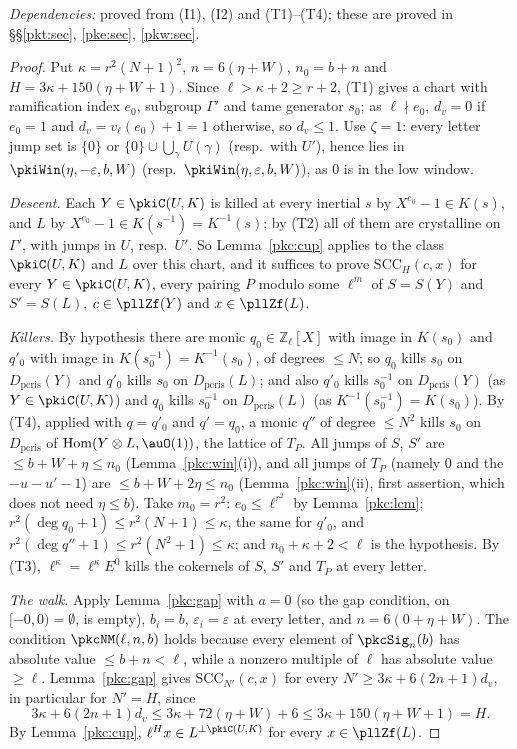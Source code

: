 \documentclass[10pt]{amsart}
\theoremstyle{definition}
\theoremstyle{remark}
\newcommand{\Z}{\mathbb Z}
\begin{document}
\emph{Dependencies:} proved from (I1), (I2) and (T1)--(T4); these are proved in \S\S\ref{pkt:sec},
\ref{pke:sec}, \ref{pkw:sec}.

\begin{proof}
Put $\kappa=r^2(N+1)^2$, $n=6(\eta+W)$, $n_0=b+n$ and $H=3\kappa+150(\eta+W+1)$. Since
$\ell>\kappa+2\ge r+2$, (T1) gives a chart with ramification index $e_0$, subgroup $\Gamma'$ and tame
generator $s_0$; as $\ell\nmid e_0$, $d_v=0$ if $e_0=1$ and $d_v=v_\ell(e_0)+1=1$ otherwise, so $d_v\le1$.
Use $\zeta=1$: every letter jump set is $\{0\}$ or $\{0\}\cup\bigcup_\gamma U(\gamma)$ (resp.\ with
$U'$), hence lies in $\pkiWin(\eta,-\varepsilon,b,W)$ (resp.\ $\pkiWin(\eta,\varepsilon,b,W)$), as $0$ is
in the low window.

\emph{Descent.} Each $Y\in\pkiC(U,K)$ is killed at every inertial $s$ by $X^{e_0}-1\in K(s)$, and $L$ by
$X^{e_0}-1\in K(s^{-1})=K^{-1}(s)$; by (T2) all of them are crystalline on $\Gamma'$, with jumps in $U$,
resp.\ $U'$. So Lemma~\ref{pkc:cup} applies to the class $\pkiC(U,K)$ and $L$ over this chart, and it
suffices to prove $\mathrm{SCC}_H(c,x)$ for every $Y\in\pkiC(U,K)$, every pairing $P$ modulo some
$\ell^m$ of $S=S(Y)$ and $S'=S(L)$, $c\in\pllZf(Y)$ and $x\in\pllZf(L)$.

\emph{Killers.} By hypothesis there are monic $q_0\in\Z_\ell[X]$ with image in $K(s_0)$ and $q'_0$ with
image in $K(s_0^{-1})=K^{-1}(s_0)$, of degrees $\le N$; so $q_0$ kills $s_0$ on $D_{\mathrm{pcris}}(Y)$
and $q'_0$ kills $s_0$ on $D_{\mathrm{pcris}}(L)$; and also $q'_0$ kills $s_0^{-1}$ on
$D_{\mathrm{pcris}}(Y)$ (as $Y\in\pkiC(U,K)$) and $q_0$ kills $s_0^{-1}$ on $D_{\mathrm{pcris}}(L)$ (as
$K^{-1}(s_0^{-1})=K(s_0)$). By (T4), applied with $q=q'_0$ and $q'=q_0$, a monic
$q''$ of degree $\le N^2$ kills $s_0$ on $D_{\mathrm{pcris}}$ of $\operatorname{Hom}(Y\otimes L,\auO(1))$,
the lattice of $T_P$. All jumps of $S$, $S'$ are $\le b+W+\eta\le n_0$ (Lemma~\ref{pkc:win}(i)), and all
jumps of $T_P$ (namely $0$ and the $-u-u'-1$) are $\le b+W+2\eta\le n_0$ (Lemma~\ref{pkc:win}(ii), first
assertion, which does not need $\eta\le b$). Take $m_0=r^2$: $e_0\le\ell^{r^2}$ by Lemma~\ref{pkc:lcm};
$r^2(\deg q_0+1)\le r^2(N+1)\le\kappa$, the same for $q'_0$, and $r^2(\deg q''+1)\le r^2(N^2+1)\le\kappa$;
and $n_0+\kappa+2<\ell$ is the hypothesis. By (T3), $\ell^\kappa=\ell^\kappa E^0$ kills the cokernels of
$S$, $S'$ and $T_P$ at every letter.

\emph{The walk.} Apply Lemma~\ref{pkc:gap} with $a=0$ (so the gap condition, on $[-0,0)=\emptyset$, is
empty), $b_i=b$, $\varepsilon_i=\varepsilon$ at every letter, and $n=6(0+\eta+W)$. The condition
$\pkcNM(\ell,n,b)$ holds because every element of $\pkcSig_n(b)$ has absolute value $\le b+n<\ell$, while
a nonzero multiple of $\ell$ has absolute value $\ge\ell$. Lemma~\ref{pkc:gap} gives
$\mathrm{SCC}_{N'}(c,x)$ for every $N'\ge3\kappa+6(2n+1)d_v$, in particular for $N'=H$, since
\[
3\kappa+6(2n+1)d_v\le3\kappa+72(\eta+W)+6\le3\kappa+150(\eta+W+1)=H .
\]
By Lemma~\ref{pkc:cup}, $\ell^Hx\in L^{\perp\pkiC(U,K)}$ for every $x\in\pllZf(L)$.
\end{proof}
\end{document}
